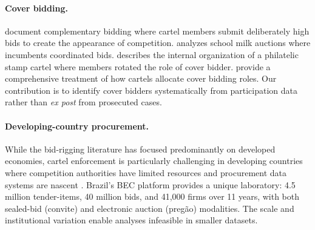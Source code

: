 \paragraph{Cover bidding.}
\citet{porter1999ohio} document complementary bidding where cartel
members submit deliberately high bids to create the appearance of
competition. \citet{pesendorfer2000study} analyzes school milk auctions
where incumbents coordinated bids. \citet{asker2010leniency} describes
the internal organization of a philatelic stamp cartel where members
rotated the role of cover bidder. \citet{marshall2012economics} provide a
comprehensive treatment of how cartels allocate cover bidding roles. Our
contribution is to identify cover bidders systematically from
participation data rather than \emph{ex post} from prosecuted cases.

\paragraph{Developing-country procurement.}
While the bid-rigging literature has focused predominantly on developed
economies, cartel enforcement is particularly challenging in developing
countries where competition authorities have limited resources and
procurement data systems are nascent
\citep{sanchezgraells2019screening}. Brazil's BEC platform provides a
unique laboratory: 4.5 million tender-items, 40 million bids, and 41,000
firms over 11 years, with both sealed-bid (convite) and electronic
auction (preg\~ao) modalities. The scale and institutional variation
enable analyses infeasible in smaller datasets.

